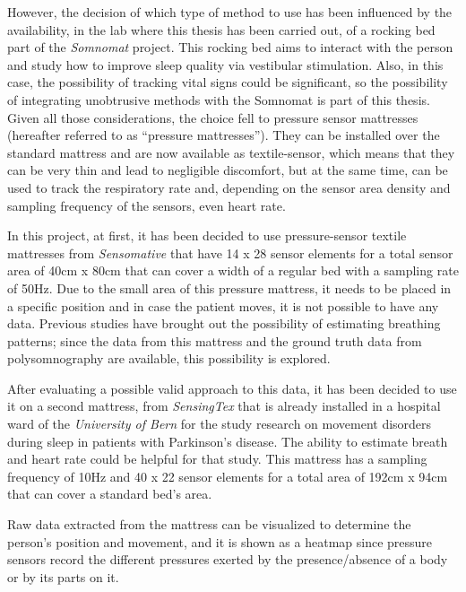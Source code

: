 However, the decision of which type of method to use has been influenced by the availability, in the lab where this thesis has been carried out, of a rocking bed part of the \textit{Somnomat}\cite{DevelopingSleep} project. This rocking bed aims to interact with the person and study how to improve sleep quality via vestibular stimulation. Also, in this case, the possibility of tracking vital signs could be significant, so the possibility of integrating unobtrusive methods with the Somnomat is part of this thesis.
Given all those considerations, the choice fell to pressure sensor mattresses (hereafter referred to as ``pressure mattresses'').
They can be installed over the standard mattress and are now available as textile-sensor, which means that they can be very thin and lead to negligible discomfort, but at the same time, can be used to track the respiratory rate and, depending on the sensor area density and sampling frequency of the sensors, even heart rate. 

In this project, at first, it has been decided to use pressure-sensor textile mattresses from \textit{Sensomative} \cite{sensomativeUrl} that have 14 x 28 sensor elements for a total sensor area of 40cm x 80cm that can cover a width of a regular bed with a sampling rate of 50Hz. Due to the small area of this pressure mattress, it needs to be placed in a specific position and in case the patient moves, it is not possible to have any data. Previous studies have brought out the possibility of estimating breathing patterns; since the data from this mattress and the ground truth data from polysomnography are available, this possibility is explored.

After evaluating a possible valid approach to this data, it has been decided to use it on a second mattress, from \textit{SensingTex} \cite{SensingConnectivity} that is already installed in a hospital ward of the \textit{University of Bern} for the study research on movement disorders during sleep in patients with Parkinson’s disease. The ability to estimate breath and heart rate could be helpful for that study.
This mattress has a sampling frequency of 10Hz and 40 x 22 sensor elements for a total area of 192cm x 94cm that can cover a standard bed's area.

Raw data extracted from the mattress can be visualized to determine the person's position and movement, and it is shown as a heatmap since pressure sensors record the different pressures exerted by the presence/absence of a body or by its parts on it. 

